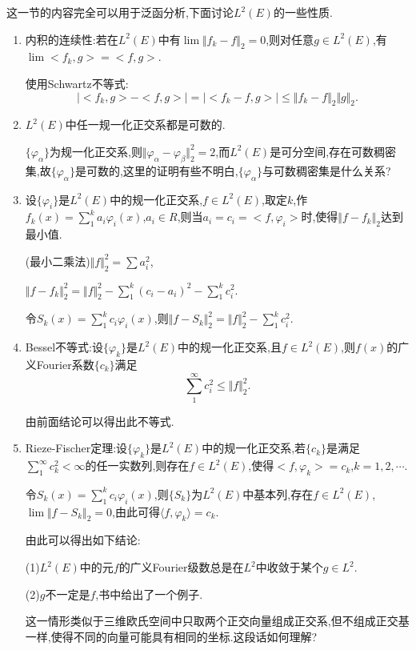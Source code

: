 \documentclass[12pt,a4paper,openany]{book}
\begin{document}
这一节的内容完全可以用于泛函分析,下面讨论$L^2(E)$的一些性质.

\begin{enumerate}
\item 内积的连续性:若在$L^2(E)$中有$\lim{\Vert{f_k-f}\Vert_2}=0$,则对任意$g \in L^2(E)$,有$\lim{<f_k,g>}=<f,g>$.

使用Schwartz不等式:
\[
|<f_k,g> - <f,g>|=|<f_k-f,g>| \le \Vert{f_k-f}\Vert_2\Vert{g}\Vert_2.
\]

\item $L^2(E)$中任一规一化正交系都是可数的.

$\{\varphi_{\alpha}\}$为规一化正交系,则$\Vert{\varphi_{\alpha}-\varphi_{\beta}}\Vert_2^2=2$,而$L^2(E)$是可分空间,存在可数稠密集,故$\{\varphi_{\alpha}\}$是可数的,这里的证明有些不明白,$\{\varphi_{\alpha}\}$与可数稠密集是什么关系?

\item 设$\{\varphi_{i}\}$是$L^2(E)$中的规一化正交系,$f \in L^2(E)$,取定$k$,作$f_k(x)=\sum_{1}^{k}{a_i\varphi_i(x)}$,$a_i \in R$,则当$a_i=c_i=<f,\varphi_i>$时,使得$\Vert{f-f_k}\Vert_2$达到最小值.

(最小二乘法)$\Vert{f}\Vert_2^2=\sum{a_i^2}$,

$\Vert{f-f_k}\Vert_2^2 = \Vert{f}\Vert_2^2-\sum_{1}^{k}{(c_i-a_i)^2} - \sum_{1}^{k}{c_i^2}$.

令$S_k(x)=\sum_{1}^{k}{c_i\varphi_i(x)}$,则$\Vert{f-S_k}\Vert_2^2=\Vert{f}\Vert_2^2-\sum_{1}^{k}{c_i^2}$.

\item Bessel不等式:设$\{\varphi_k\}$是$L^2(E)$中的规一化正交系,且$f \in L^2(E)$,则$f(x)$的广义Fourier系数$\{c_k\}$满足
\[
\sum_{1}^{\infty}{c_i^2} \le \Vert{f}\Vert_2^2.
\]

由前面结论可以得出此不等式.

\item Rieze-Fischer定理:设$\{\varphi_k\}$是$L^2(E)$中的规一化正交系,若$\{c_k\}$是满足$\sum_{1}^{\infty}{c_k^2}<\infty$的任一实数列,则存在$f \in L^2(E)$,使得$<f,\varphi_k>=c_k$,$k=1,2,\cdots$.

令$S_k(x)=\sum_{1}^{k}{c_i\varphi_i(x)}$,则$\{S_k\}$为$L^2(E)$中基本列,存在$f \in L^2(E)$,$\lim{\Vert{f - S_k}\Vert_2}=0$,由此可得$\langle{f,\varphi_k}\rangle=c_k$.

由此可以得出如下结论:

(1)$L^2(E)$中的元$f$的广义Fourier级数总是在$L^2$中收敛于某个$g \in L^2$.

(2)$g$不一定是$f$,书中给出了一个例子.

这一情形类似于三维欧氏空间中只取两个正交向量组成正交系,但不组成正交基一样,使得不同的向量可能具有相同的坐标.这段话如何理解?


\end{enumerate}
\end{document}
